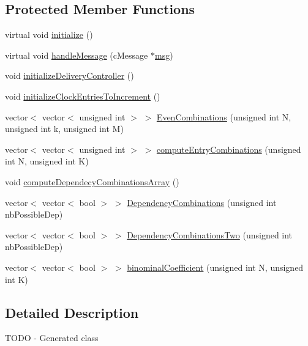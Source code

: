 \subsection*{Protected Member Functions}
\begin{DoxyCompactItemize}
\item 
virtual void \hyperlink{classSimulationParameters_a1fa495ef59a10cb9a0aff42f3e2625ef}{initialize} ()
\item 
virtual void \hyperlink{classSimulationParameters_a9966d132ac2b5dc248973185a1a8deb4}{handle\+Message} (c\+Message $\ast$\hyperlink{Controller_8h_afa0f3b802fbc219228f7bb97996fa558}{msg})
\item 
void \hyperlink{classSimulationParameters_afec1fdd41805feba54ad575a4542aab1}{initialize\+Delivery\+Controller} ()
\item 
void \hyperlink{classSimulationParameters_aeef091d6ca357795fa7ff6b3661fb2fd}{initialize\+Clock\+Entries\+To\+Increment} ()
\item 
vector$<$ vector$<$ unsigned int $>$ $>$ \hyperlink{classSimulationParameters_ae7a743b60e8ac2352e4845b104038bde}{Even\+Combinations} (unsigned int N, unsigned int k, unsigned int M)
\item 
vector$<$ vector$<$ unsigned int $>$ $>$ \hyperlink{classSimulationParameters_a6157da0870526895f7619d614e3b72d0}{compute\+Entry\+Combinations} (unsigned int N, unsigned int K)
\item 
void \hyperlink{classSimulationParameters_a09bec9dc793646bd71f610eee824dc21}{compute\+Dependecy\+Combinations\+Array} ()
\item 
vector$<$ vector$<$ bool $>$ $>$ \hyperlink{classSimulationParameters_a9694dd5f7c2028efe03dc273d8fdcbd7}{Dependency\+Combinations} (unsigned int nb\+Possible\+Dep)
\item 
vector$<$ vector$<$ bool $>$ $>$ \hyperlink{classSimulationParameters_a4e6bb792e1487214e5cf1d64c8841064}{Dependency\+Combinations\+Two} (unsigned int nb\+Possible\+Dep)
\item 
vector$<$ vector$<$ bool $>$ $>$ \hyperlink{classSimulationParameters_ab0615d3df4a78df81566d219e6e9529f}{binominal\+Coefficient} (unsigned int N, unsigned int K)
\end{DoxyCompactItemize}


\subsection{Detailed Description}
T\+O\+DO -\/ Generated class 

